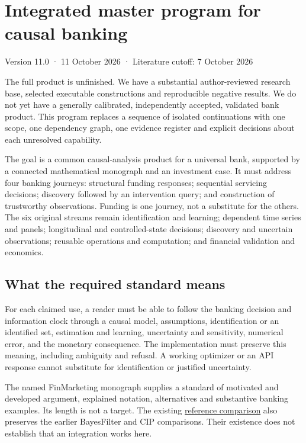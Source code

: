 \documentclass[
  11pt,
  a4paper,
]{article}
\author{}
\date{}
\begin{document}
\hypertarget{integrated-master-program-for-causal-banking}{%
\section{Integrated master program for causal
banking}\label{integrated-master-program-for-causal-banking}}

Version 11.0 · 11 October 2026 · Literature cutoff: 7 October 2026

The full product is unfinished. We have a substantial author-reviewed
research base, selected executable constructions and reproducible
negative results. We do not yet have a generally calibrated,
independently accepted, validated bank product. This program replaces a
sequence of isolated continuations with one scope, one dependency graph,
one evidence register and explicit decisions about each unresolved
capability.

The goal is a common causal-analysis product for a universal bank,
supported by a connected mathematical monograph and an investment case.
It must address four banking journeys: structural funding responses;
sequential servicing decisions; discovery followed by an intervention
query; and construction of trustworthy observations. Funding is one
journey, not a substitute for the others. The six original streams
remain identification and learning; dependent time series and panels;
longitudinal and controlled-state decisions; discovery and uncertain
observations; reusable operations and computation; and financial
validation and economics.

\hypertarget{what-the-required-standard-means}{%
\subsection{What the required standard
means}\label{what-the-required-standard-means}}

For each claimed use, a reader must be able to follow the banking
decision and information clock through a causal model, assumptions,
identification or an identified set, estimation and learning,
uncertainty and sensitivity, numerical error, and the monetary
consequence. The implementation must preserve this meaning, including
ambiguity and refusal. A working optimizer or an API response cannot
substitute for identification or justified uncertainty.

The named FinMarketing monograph supplies a standard of motivated and
developed argument, explained notation, alternatives and substantive
banking examples. Its length is not a target. The existing
\href{../reviews/scholarship-reset-2026-10-08.md}{reference comparison}
also preserves the earlier BayesFilter and CIP comparisons. Their
existence does not establish that an integration works here.
\end{document}
